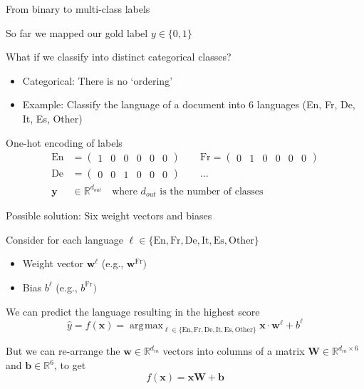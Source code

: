\documentclass[12pt,aspectratio=169,handout]{beamer}
\DeclareMathOperator*{\argmax}{arg\!\max}
\begin{document}
\begin{frame}{From binary to multi-class labels}
	
So far we mapped our gold label $y \in \{0, 1\}$

What if we classify into distinct categorical classes?

\begin{itemize}
	\item Categorical: There is no `ordering'
	\item Example: Classify the language of a document into 6 languages (En, Fr, De, It, Es, Other)
\end{itemize}

\pause
\begin{block}{One-hot encoding of labels}
$$
\begin{aligned}
\text{En} &= \begin{pmatrix}1 & 0 & 0 & 0 & 0 & 0\end{pmatrix} \qquad
\text{Fr} = \begin{pmatrix}0 & 1 & 0 & 0 & 0 & 0\end{pmatrix} \\
\text{De} &= \begin{pmatrix}0 & 0 & 1 & 0 & 0 & 0\end{pmatrix} \qquad \ldots \\
\bm{y} &\in \mathbb{R}^{d_{out}} \quad \text{where } d_{out} \text{ is the number of classes}
\end{aligned}
$$
\end{block}
	
\end{frame}

\begin{frame}{Possible solution: Six weight vectors and biases}
	
Consider for each language $\ell \in \{\text{En}, \text{Fr}, \text{De}, \text{It}, \text{Es}, \text{Other}\}$
\begin{itemize}
	\item Weight vector $\bm{w}^{\ell}$ (e.g., $\bm{w}^{\text{Fr}})$
	\item Bias $b^{\ell}$ (e.g., $b^{\text{Fr}})$
\end{itemize}
\pause We can predict the language resulting in the highest score
$$
\hat{y} = f(\bm{x}) = \argmax_{
\ell \in \{\text{En}, \text{Fr}, \text{De}, \text{It}, \text{Es}, \text{Other}\}
}
\bm{x} \cdot \bm{w}^{\ell} + b^{\ell}
$$

\pause
But we can re-arrange the $\bm{w} \in \mathbb{R}^{d_{in}}$ vectors into columns of a matrix $\bm{W} \in \mathbb{R}^{d_{in} \times 6}$ and $\bm{b} \in \mathbb{R}^6$, to get
$$f(\bm{x}) = \bm{x} \bm{W} + \bm{b}$$
	
\end{frame}
\end{document}
